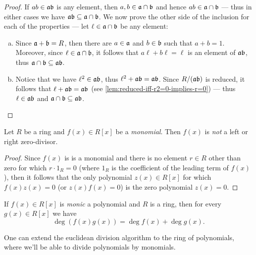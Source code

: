 \begin{proof}
If \(a b \in \mathfrak{a b}\) is any element, then
\(a, b \in \mathfrak{a} \cap \mathfrak{b}\) and hence
\(a b \in \mathfrak{a} \cap \mathfrak{b}\) --- thus in either cases we have
\(\mathfrak{a b} \subseteq \mathfrak{a} \cap \mathfrak{b}\). We now prove the other side
of the inclusion for each of the properties --- let
\(\ell \in \mathfrak{a} \cap \mathfrak{b}\) be any element:
\begin{enumerate}[(a)]\setlength\itemsep{0em}
\item Since \(\mathfrak{a} + \mathfrak{b} = R\), then there are \(a \in \mathfrak{a}\)
  and \(b \in \mathfrak{b}\) such that \(a + b = 1\). Moreover, since
  \(\ell \in \mathfrak{a} \cap \mathfrak{b}\), it follows that
  \(a \ell + b \ell = \ell\) is an element of \(\mathfrak{a b}\), thus
  \(\mathfrak{a} \cap \mathfrak{b} \subseteq \mathfrak{a b}\).

\item Notice that we have \(\ell^2 \in \mathfrak{a b}\), thus
  \(\ell^2 + \mathfrak{a b} = \mathfrak{a b}\). Since \(R/(\mathfrak{a b})\) is reduced,
  it follows that \(\ell + \mathfrak{a b} = \mathfrak{a b}\) (see
  \cref{lem:reduced-iff-r2=0-implies-r=0}) --- thus \(\ell \in \mathfrak{a b}\) and
  \(\mathfrak{a} \cap \mathfrak{b} \subseteq \mathfrak{a b}\).
\end{enumerate}
\end{proof}

\begin{lemma}
\label{lem:monomial-non-zero-divisor}
Let \(R\) be a ring and \(f(x) \in R[x]\) be a \emph{monomial}. Then \(f(x)\) is
\emph{not} a left or right zero-divisor.
\end{lemma}

\begin{proof}
Since \(f(x)\) is is a monomial and there is no element \(r \in R\) other than
zero for which \(r \cdot 1_R = 0\) (where \(1_R\) is the coefficient of the
leading term of \(f(x)\)), then it follows that the only polynomial
\(z(x) \in R[x]\) for which \(f(x) z(x) = 0\) (or \(z(x) f(x) = 0\)) is the zero
polynomial \(z(x) = 0\).
\end{proof}


\begin{lemma}
\label{lem:degree-product-of-polynomials}
If \(f(x) \in R[x]\) is \emph{monic} a polynomial and \(R\) is a ring, then for
every \(g(x) \in R[x]\) we have
\[
\deg (f(x) g(x)) = \deg f(x) + \deg g(x).
\]
\end{lemma}

One can extend the euclidean division algorithm to the ring of polynomials,
where we'll be able to divide polynomials by monomials.

